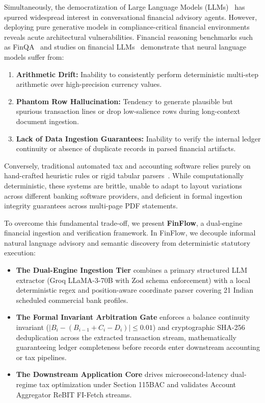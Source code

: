 \documentclass[conference]{IEEEtran}
\begin{document}
Simultaneously, the democratization of Large Language Models (LLMs)~\cite{vaswani2017attention, wu2023bloomberggpt} has spurred widespread interest in conversational financial advisory agents. However, deploying pure generative models in compliance-critical financial environments reveals acute architectural vulnerabilities. Financial reasoning benchmarks such as FinQA~\cite{chen2021finqa} and studies on financial LLMs~\cite{yang2023fingpt} demonstrate that neural language models suffer from:
\begin{enumerate}
    \item \textbf{Arithmetic Drift:} Inability to consistently perform deterministic multi-step arithmetic over high-precision currency values.
    \item \textbf{Phantom Row Hallucination:} Tendency to generate plausible but spurious transaction lines or drop low-salience rows during long-context document ingestion.
    \item \textbf{Lack of Data Ingestion Guarantees:} Inability to verify the internal ledger continuity or absence of duplicate records in parsed financial artifacts.
\end{enumerate}

Conversely, traditional automated tax and accounting software relies purely on hand-crafted heuristic rules or rigid tabular parsers~\cite{ijcrt2024taxadvisor, ijert2024autoitr}. While computationally deterministic, these systems are brittle, unable to adapt to layout variations across different banking software providers, and deficient in formal ingestion integrity guarantees across multi-page PDF statements.

To overcome this fundamental trade-off, we present \textbf{FinFlow}, a dual-engine financial ingestion and verification framework. In FinFlow, we decouple informal natural language advisory and semantic discovery from deterministic statutory execution:
\begin{itemize}
    \item \textbf{The Dual-Engine Ingestion Tier} combines a primary structured LLM extractor (Groq LLaMA-3-70B with Zod schema enforcement) with a local deterministic regex and position-aware coordinate parser covering 21 Indian scheduled commercial bank profiles.
    \item \textbf{The Formal Invariant Arbitration Gate} enforces a balance continuity invariant ($|B_i - (B_{i-1} + C_i - D_i)| \le 0.01$) and cryptographic SHA-256 deduplication across the extracted transaction stream, mathematically guaranteeing ledger completeness before records enter downstream accounting or tax pipelines.
    \item \textbf{The Downstream Application Core} drives microsecond-latency dual-regime tax optimization under Section 115BAC and validates Account Aggregator ReBIT FI-Fetch streams.
\end{itemize}
\end{document}
